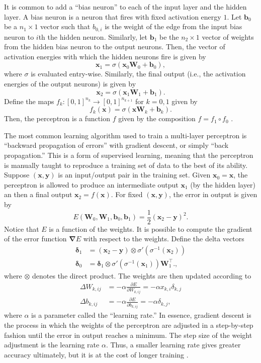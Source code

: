 \documentclass[12pt]{article}
\newcommand{\vecx}{\mathbf{x}}
\newcommand{\vecy}{\mathbf{y}}
\newcommand{\vecb}{\mathbf{b}}
\newcommand{\matW}{\mathbf{W}}
\newcommand{\pdiff}[2]{\frac{\partial #1}{\partial #2}}
\newcommand{\del}{\mathbf{\nabla}}
\newcommand{\vdelta}{\mathbf{\delta}}
\begin{document}
It is common to add a ``bias neuron'' to each of the input layer and the hidden layer. A bias neuron is a neuron that fires with fixed activation energy $1$. Let $\vecb_0$ be a $n_1\times 1$ vector such that $b_{0,i}$ is the weight of the edge from the input bias neuron to $i$th the hidden neuron. Similarly, let $\vecb_1$ be the $n_2\times 1$ vector of weights from the hidden bias neuron to the output neurons. Then, the vector of activation energies with which the hidden neurons fire is given by
\[ \vecx_1 = \sigma(\vecx_0\matW_0+\vecb_0), \]
where $\sigma$ is evaluated entry-wise. Similarly, the final output (i.e., the activation energies of the output neurons) is given by
\[ \vecx_2 = \sigma(\vecx_1\matW_1+\vecb_1). \]
Define the maps $f_k:[0,1]^{n_k}\to[0,1]^{n_{k+1}}$ for $k=0,1$ given by
\begin{equation} \label{fk}
f_k(\vecx) = \sigma(\vecx\matW_k+\vecb_k).
\end{equation}
Then, the perceptron is a function $f$ given by the composition $f = f_1\circ f_0$ \cite{perceptron}.

The most common learning algorithm used to train a multi-layer perceptron is ``backward propagation of errors'' with gradient descent, or simply ``back propagation.'' This is a form of supervised learning, meaning that the perceptron is manually taught to reproduce a training set of data to the best of its ability. Suppose $(\vecx, \vecy)$ is an input/output pair in the training set. Given $\vecx_0 = \vecx$, the perceptron is allowed to produce an intermediate output $\vecx_1$ (by the hidden layer) an then a final output $\vecx_2 = f(\vecx)$. For fixed $(\vecx,\vecy)$, the error in output is given by
\begin{equation} \label{error}
E(\matW_0,\matW_1,\vecb_0,\vecb_1) = \frac{1}{2} (\vecx_2-\vecy)^2.
\end{equation}
Notice that $E$ is a function of the weights. It is possible to compute the gradient of the error function $\del E$ with respect to the weights. Define the delta vectors
\begin{align} \label{delta1}
\vdelta_1 &= (\vecx_2-\vecy)\otimes \sigma'(\sigma^{-1}(\vecx_2)) \\
\label{delta0}
\vdelta_0 &= \vdelta_1\otimes \sigma'(\sigma^{-1}(\vecx_1))\matW_1^\top.,
\end{align}
where $\otimes$ denotes the direct product. The weights are then updated according to
\begin{align} \label{weights_update}
\Delta W_{k,ij} &= -\alpha \pdiff{E}{W_{k,ij}}
= -\alpha x_{k,i} \delta_{k,j} \\
\label{bias_update}
\Delta b_{k,ij} &= -\alpha \pdiff{E}{b_{k,ij}}
= -\alpha \delta_{k,j},
\end{align}
where $\alpha$ is a parameter called the ``learning rate.'' In essence, gradient descent is the process in which the weights of the perceptron are adjusted in a step-by-step fashion until the error in output reaches a minimum. The step size of the weight adjustment is the learning rate $\alpha$. Thus, a smaller learning rate gives greater accuracy ultimately, but it is at the cost of longer training \cite{nature}.
\end{document}
